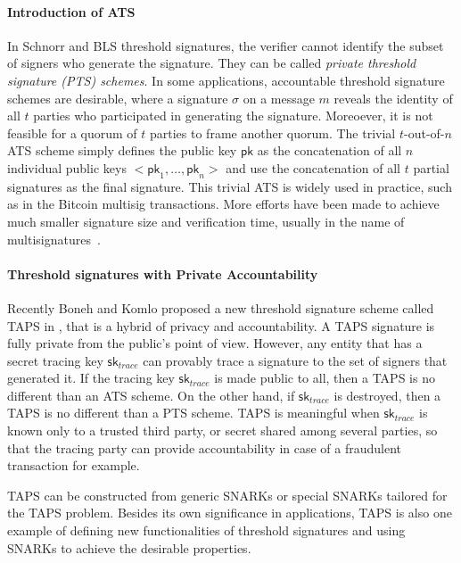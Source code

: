 \paragraph{Introduction of ATS} In Schnorr and BLS threshold signatures, the verifier cannot identify the subset of signers who generate the signature. They can be called \textit{private threshold signature (PTS) schemes}.  In some applications, accountable threshold signature schemes are desirable, where a signature $\sigma$ on a message $m$ reveals the identity of all $t$ parties who participated in generating the signature. Moreoever, it is not feasible for a quorum of $t$ parties to frame another quorum. The trivial $t$-out-of-$n$ ATS scheme simply defines the public key $\mathsf{pk}$ as the concatenation of all $n$ individual public keys $<\mathsf{pk}_1,\dots, \mathsf{pk}_n>$ and use the concatenation of all $t$ partial signatures as the final signature. This trivial ATS is widely used in practice, such as in the Bitcoin multisig transactions. More efforts have been made to achieve much smaller signature size and verification time, usually in the name of multisignatures~\cite{DBLP:conf/crypto/NickRS21}. 

\paragraph{Threshold signatures with Private Accountability} Recently Boneh and Komlo proposed a new threshold signature scheme called TAPS in \cite{DBLP:conf/crypto/BonehK22}, that is a hybrid of privacy and accountability. A TAPS signature is fully private from the public's point of view. However, any entity that has a secret tracing key $\mathsf{sk}_{trace}$ can provably trace a signature to the set of signers that generated it. If the tracing key $\mathsf{sk}_{trace}$ is made public to all, then a TAPS is no different than an ATS scheme. On the other hand, if $\mathsf{sk}_{trace}$ is destroyed, then a TAPS is no different than a PTS scheme. TAPS is meaningful when $\mathsf{sk}_{trace}$ is known only to a trusted third party, or secret shared among several parties, so that the tracing party can provide accountability in case of a fraudulent transaction for example. 


TAPS can be constructed from generic SNARKs or special SNARKs tailored for the TAPS problem. Besides its own significance in applications, TAPS is also one example of defining new functionalities of threshold signatures and using SNARKs to achieve the desirable properties. 

